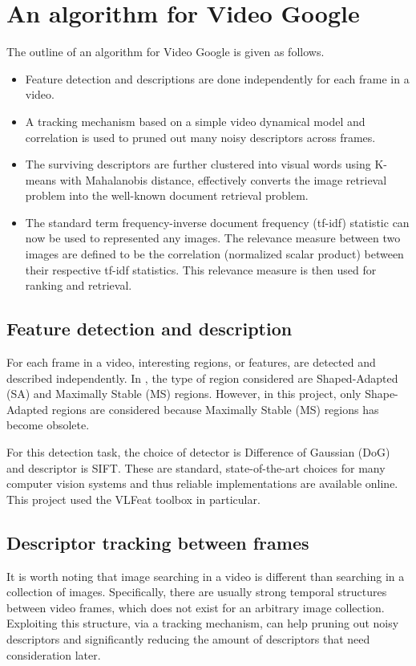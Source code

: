 \documentclass[conference]{IEEEtran}
\begin{document}
\section{An algorithm for Video Google}
\label{sec:alg}
The outline of an algorithm for Video Google is given as follows.
\begin{itemize}
\item Feature detection and descriptions are done independently for each frame in a video.
\item A tracking mechanism based on a simple video dynamical model and correlation is used to pruned out many noisy descriptors across frames.
\item The surviving descriptors are further clustered into visual words using K-means with Mahalanobis distance, effectively converts 
the image retrieval problem into the well-known document retrieval problem.
\item The standard term frequency-inverse document frequency (tf-idf) statistic  can now be used to represented any images. The relevance measure
between two images are defined to be the correlation (normalized scalar product) between their respective tf-idf statistics. This relevance measure is
then used for ranking and retrieval.
\end{itemize}

\subsection{Feature detection and description}
For each frame in a video, interesting regions, or features, are detected and described independently. 
In \cite{sivic2003video}, the type of region considered are Shaped-Adapted (SA) and Maximally Stable (MS) regions. However, in this project,
only Shape-Adapted regions are considered because Maximally Stable (MS) regions has become obsolete. 

For this detection task, the choice of detector is Difference of Gaussian (DoG) and descriptor is SIFT. These are standard, state-of-the-art choices for many
computer vision systems and thus reliable implementations are available online. This project used the VLFeat \cite{vedaldi08vlfeat} toolbox
in particular. 

\subsection{Descriptor tracking between frames}
It is worth noting that image searching in a video is different than searching in a collection of images.
Specifically, there are usually strong temporal structures between video frames, which does not exist for an arbitrary image collection.
Exploiting this structure, via a tracking mechanism, can help pruning out noisy descriptors and significantly reducing the amount of descriptors
that need consideration later.
\end{document}

